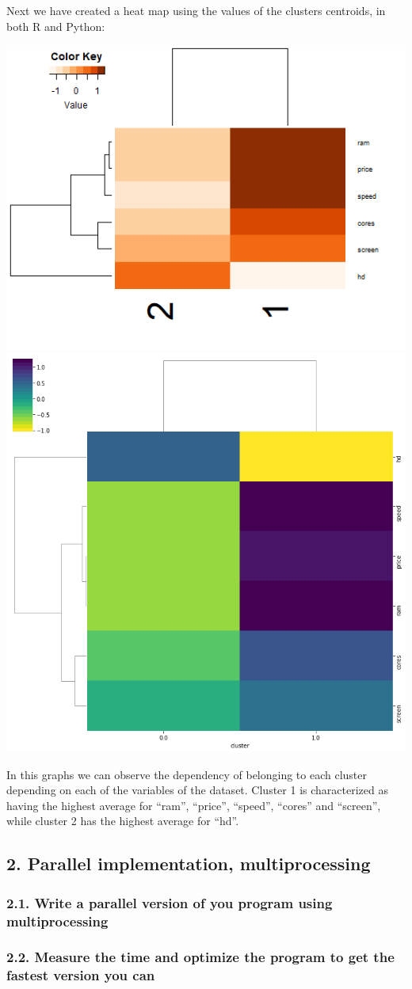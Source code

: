 \documentclass[
]{article}
\begin{document}
Next we have created a heat map using the values of the clusters
centroids, in both R and Python:

\includegraphics[width=0.5\linewidth]{heatmap}
\includegraphics[width=0.5\linewidth]{heatmapPython}

In this graphs we can observe the dependency of belonging to each
cluster depending on each of the variables of the dataset. Cluster 1 is
characterized as having the highest average for ``ram'', ``price'',
``speed'', ``cores'' and ``screen'', while cluster 2 has the highest
average for ``hd''.

\hypertarget{parallel-implementation-multiprocessing}{%
\subsection{2. Parallel implementation,
multiprocessing}\label{parallel-implementation-multiprocessing}}

\hypertarget{write-a-parallel-version-of-you-program-using-multiprocessing}{%
\subsubsection{2.1. Write a parallel version of you program using
multiprocessing}\label{write-a-parallel-version-of-you-program-using-multiprocessing}}

\hypertarget{measure-the-time-and-optimize-the-program-to-get-the-fastest-version-you-can}{%
\subsubsection{2.2. Measure the time and optimize the program to get the
fastest version you
can}\label{measure-the-time-and-optimize-the-program-to-get-the-fastest-version-you-can}}
\end{document}
